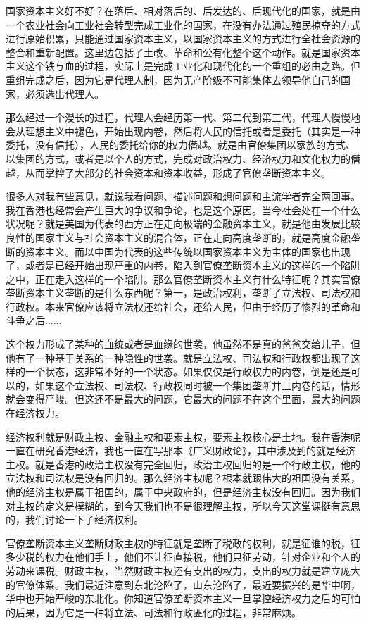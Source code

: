 \documentclass[UTF8, 12pt, a4paper]{ctexrep}
\begin{document}
国家资本主义好不好？在落后、相对落后的、后发达的、后现代化的国家，就是由一个农业社会向工业社会转型完成工业化的国家，在没有办法通过殖民掠夺的方式进行原始积累，只能通过国家资本主义，以国家资本主义的方式进行全社会资源的整合和重新配置。这里边包括了土改、革命和公有化整个这个动作。就是国家资本主义这个铁与血的过程，实际上是完成工业化和现代化的一个重组的必由之路。但重组完成之后，因为它是代理人制，因为无产阶级不可能集体去领导他自己的国家，必须选出代理人。

那么经过一个漫长的过程，代理人会经历第一代、第二代到第三代，代理人慢慢地会从理想主义中褪色，开始出现内卷，然后将人民的信托或者是委托（其实是一种委托，没有信托），人民的委托给你的权力僭越。就是由官僚集团以家族的方式、以集团的方式，或者是以个人的方式，完成对政治权力、经济权力和文化权力的僭越，从而掌控了大部分的社会资本和资本收益，形成了官僚垄断资本主义。

很多人对我有些意见，就说我看问题、描述问题和想问题和主流学者完全两回事。我在香港也经常会产生巨大的争议和争论，也是这个原因。当今社会处在一个什么状况呢？就是美国为代表的西方正在走向极端的金融资本主义，就是他由发展比较良性的国家主义与社会资本主义的混合体，正在走向高度垄断的，就是高度金融垄断的资本主义。而以中国为代表的这些传统以国家资本主义为主体的国家也出现了，或者是已经开始出现严重的内卷，陷入到官僚垄断资本主义的这样的一个陷阱之中，正在走入这样的一个陷阱。那么官僚垄断资本主义有什么特征呢？其实官僚垄断资本主义垄断的是什么东西呢？第一，是政治权利，垄断了立法权、司法权和行政权。本来官僚应该将立法权还给社会，还给人民，但由于经历了惨烈的革命和斗争之后......

这个权力形成了某种的血统或者是血缘的世袭，他虽然不是真的爸爸交给儿子，但他有了一种基于关系的一种隐性的世袭。就是立法权、司法权和行政权都出现了这样的一个状态，这非常不好的一个状态。如果仅仅是行政权力的内卷，倒是还是可以的，如果这个立法权、司法权、行政权同时被一个集团垄断并且内卷的话，情形就会变得严峻。但这还不是最大的问题，它最大的问题不在这个里面，最大的问题在经济权力。

经济权利就是财政主权、金融主权和要素主权，要素主权核心是土地。我在香港呢一直在研究香港经济，我也一直在写那本《广义财政论》，其中涉及到的就是经济主权。就是香港的政治主权没有完全回归，政治主权回归的是一个行政主权，他的立法权和司法权是没有回归的。那么经济主权呢？根本就跟伟大的祖国没有关系，他的经济主权是属于祖国的，属于中央政府的，但是经济主权没有回归。因为我们对主权的定义是模糊的，到今天我们也不是很理解主权，所以今天这堂课挺有意思的，我们讨论一下子经济权利。

官僚垄断资本主义垄断财政主权的特征就是垄断了税政的权利，就是征谁的税，征多少税的权力在他们手上，他们不让征直接税，他们只征劳动，针对企业和个人的劳动来课税。财政主权，当然财政主权还有支出的权力，支出的权力就是建立庞大的官僚体系。我们最近注意到东北沦陷了，山东沦陷了，最近要振兴的是华中啊，华中也开始严峻的东北化。你知道官僚垄断资本主义一旦掌控经济权力之后的可怕的后果，因为它是一种将立法、司法和行政匪化的过程，非常麻烦。
\end{document}
